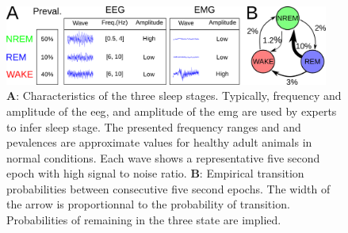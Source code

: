 
\begin{figure}[h!]
  \centering
    
    \includegraphics[width=0.95\textwidth]{figures/sleep_description.pdf}
  \caption{
  \textbf{A}: Characteristics of the three sleep stages.
  Typically, frequency and amplitude of the \acrfull{eeg}, and amplitude of the \acrfull{emg} are used by experts to infer sleep stage.
  The presented frequency ranges and and pevalences are approximate values for healthy adult animals in normal conditions.
  Each wave shows a representative five second epoch with high signal to noise ratio.
  \textbf{B}: Empirical transition probabilities between consecutive five second epochs. The width of the arrow is proportionnal to the probability of transition.
  Probabilities of remaining in the three state are implied.
  }
           
\end{figure}
